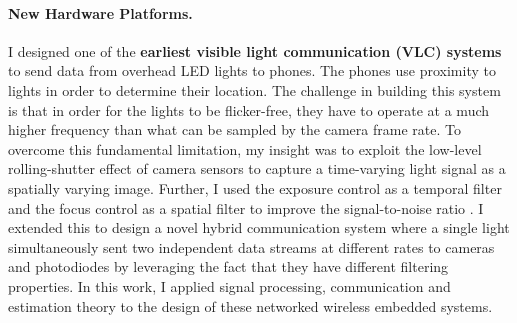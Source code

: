 \documentclass[10pt]{article}
\begin{document}

\paragraph{New Hardware Platforms. }

I designed one of the \textbf{earliest visible light communication (VLC) systems} to send data from overhead LED lights to phones. The phones use proximity to lights in order to determine their location.  The challenge in building this system is that in order for the lights to be flicker-free, they have to operate at a much higher frequency than what can be sampled by the camera frame rate. 
To overcome this fundamental limitation, my insight was to exploit the low-level rolling-shutter effect of camera sensors to capture a time-varying light signal as a spatially varying image. Further, I used the exposure control as a temporal filter and the focus control as a spatial filter to improve the signal-to-noise ratio \cite{rajagopal2014visual, rajagopal2014demonstration}. %
I extended this to design a novel hybrid communication system where a single light simultaneously sent two independent data streams at different rates to cameras and photodiodes \cite{rajagopal2014hybrid} by leveraging the fact that they have different filtering  properties. %
In this work, I applied signal processing, communication and estimation theory to the design of these networked wireless embedded systems.
\end{document}
